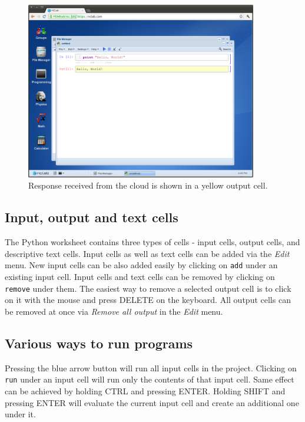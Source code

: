 \newpage

\begin{figure}[!ht]
\begin{center}
\includegraphics[width=0.9\textwidth]{imgp/python-2.png}
\end{center}
\vspace{-2mm}
\caption{Response received from the cloud is shown in a yellow output cell.}
\label{fig:python-2}
\end{figure}

\subsection{Input, output and text cells}

The Python worksheet contains three types of cells - input cells, output cells, 
and descriptive text cells. Input cells as well as text cells can be added via 
the {\em Edit} menu. New input cells can be also added easily by clicking on {\tt add} under
an existing input cell. Input cells and text cells can be removed by clicking on 
{\tt remove} under them. The easiest way to remove a selected output cell is to 
click on it with the mouse and press DELETE on the keyboard. 
All output cells can be removed at once via {\em Remove all output} in the {\em Edit} menu. 

\subsection{Various ways to run programs}

Pressing the blue arrow button will run all input cells in the project. Clicking 
on {\tt run} under an input cell will run only the contents of that input cell. 
Same effect can be achieved by holding CTRL and pressing ENTER. Holding SHIFT
and pressing ENTER will evaluate the current input cell and create an additional one
under it.

